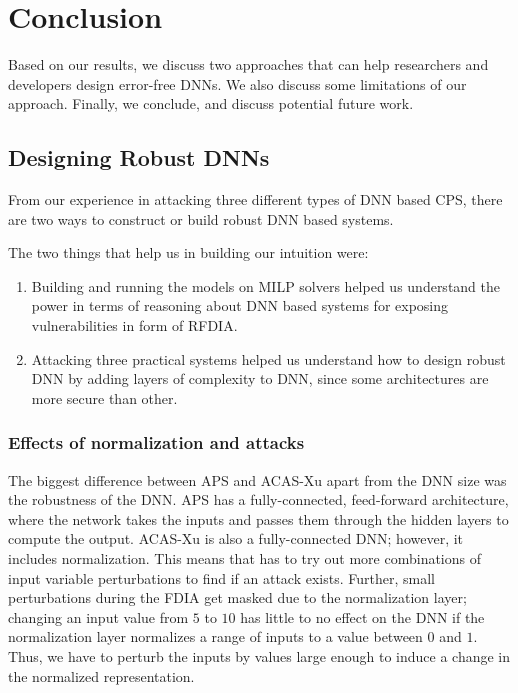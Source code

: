 \chapter{Conclusion}
\label{conclusion}


Based on our results, we discuss two approaches that can help researchers and developers design error-free \ac{DNN}s. 
We also discuss some limitations of our approach.
Finally, we conclude, and discuss potential future work.


\section{Designing Robust DNNs}
From our experience in attacking three different types of \ac{DNN} based CPS, there are two ways to construct or build robust \ac{DNN} based systems.

The two things that help us in building our intuition were:
\begin{enumerate}
	\item Building and running the models on \ac{MILP} solvers helped us understand the power in terms of reasoning about \ac{DNN} based systems for exposing vulnerabilities in form of \ac{RFDIA}. 
	\item Attacking three practical systems helped us understand how to design robust \ac{DNN} by adding layers of complexity to \ac{DNN}, since some architectures are more secure  than other. 
\end{enumerate}


\subsection{Effects of normalization and attacks}

The biggest difference between \ac{APS} and \ac{ACAS-Xu} apart from the \ac{DNN} size was the robustness of the \ac{DNN}. 
\ac{APS} has a fully-connected, feed-forward architecture, where the network takes the inputs and passes them through the hidden layers to compute the output. 
\ac{ACAS-Xu} is also a fully-connected \ac{DNN}; however, it includes normalization.
This means that \tool has to try out more combinations of input variable perturbations to find if an attack exists. 
Further, small perturbations during the \ac{FDIA} get masked due to the normalization layer; changing an input value from $5$ to $10$ has little to no effect on the \ac{DNN} if the normalization layer normalizes a range of inputs to a value between $0$ and $1$. 
Thus, we have to perturb the inputs by values large enough to induce a change in the normalized representation.
 
